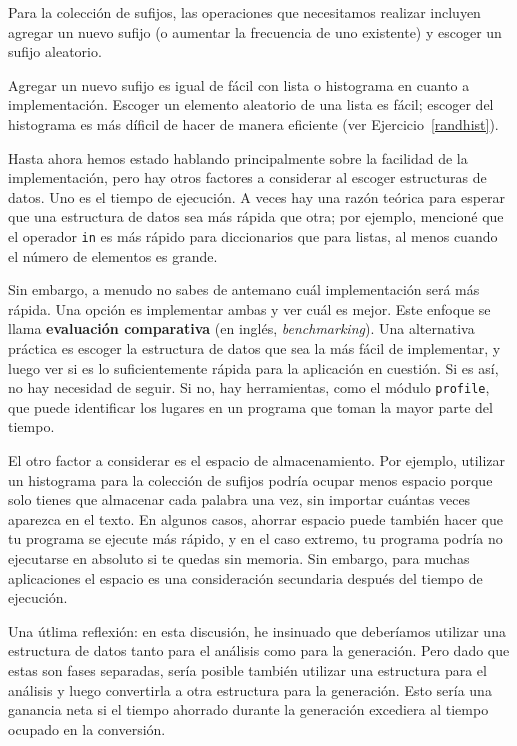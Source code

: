 \documentclass[10pt]{book}
\begin{document}
Para la colección de sufijos, las operaciones que necesitamos
realizar incluyen agregar un nuevo sufijo (o aumentar la frecuencia
de uno existente) y escoger un sufijo aleatorio.

Agregar un nuevo sufijo es igual de fácil con lista o histograma
en cuanto a implementación.  Escoger un elemento aleatorio de una lista
es fácil; escoger del histograma es más díficil de hacer 
de manera eficiente (ver Ejercicio~\ref{randhist}).

Hasta ahora hemos estado hablando principalmente sobre la facilidad de la implementación,
pero hay otros factores a considerar al escoger estructuras de datos.
Uno es el tiempo de ejecución.  A veces hay una razón teórica para esperar
que una estructura de datos sea más rápida que otra; por ejemplo, mencioné
que el operador {\tt in} es más rápido para diccionarios que para listas,
al menos cuando el número de elementos es grande.

Sin embargo, a menudo no sabes de antemano cuál implementación
será más rápida.  Una opción es implementar ambas y ver cuál
es mejor.  Este enfoque se llama {\bf evaluación comparativa} (en inglés, {\em benchmarking}).
Una alternativa práctica es escoger la estructura de datos que sea
la más fácil de implementar, y luego ver si es lo suficientemente rápida para
la aplicación en cuestión.  Si es así, no hay necesidad de seguir.  Si no,
hay herramientas, como el módulo {\tt profile}, que puede identificar
los lugares en un programa que toman la mayor parte del tiempo.

El otro factor a considerar es el espacio de almacenamiento.  Por ejemplo, utilizar un
histograma para la colección de sufijos podría ocupar menos espacio porque
solo tienes que almacenar cada palabra una vez, sin importar cuántas veces
aparezca en el texto.  En algunos casos, ahorrar espacio puede también hacer que tu
programa se ejecute más rápido, y en el caso extremo, tu programa podría no ejecutarse
en absoluto si te quedas sin memoria.  Sin embargo, para muchas aplicaciones el espacio es
una consideración secundaria después del tiempo de ejecución.

Una útlima reflexión: en esta discusión, he insinuado que
deberíamos utilizar una estructura de datos tanto para el análisis como para la generación.
Pero dado que estas son fases separadas, sería posible también utilizar una
estructura para el análisis y luego convertirla a otra estructura para
la generación.  Esto sería una ganancia neta si el tiempo ahorrado durante
la generación excediera al tiempo ocupado en la conversión.
\end{document}
